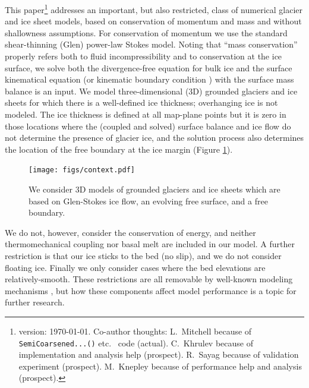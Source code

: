 \documentclass[letterpaper,final,12pt,reqno]{amsart}
\begin{document}
This paper\footnote{version: \today.  Co-author thoughts: L.~Mitchell because of \texttt{SemiCoarsened...()} etc.~ code (actual).  C.~Khrulev because of implementation and analysis help (prospect).  R.~Sayag because of validation experiment (prospect).  M.~Knepley because of performance help and analysis (prospect).} addresses an important, but also restricted, class of numerical glacier and ice sheet models, based on conservation of momentum and mass and without shallowness assumptions.  For conservation of momentum we use the standard shear-thinning (Glen) power-law Stokes model.  Noting that ``mass conservation'' properly refers both to fluid incompressibility and to conservation at the ice surface, we solve both the divergence-free equation for bulk ice and the surface kinematical equation (or kinematic boundary condition \cite{GreveBlatter2009}) with the surface mass balance is an input.  We model three-dimensional (3D) grounded glaciers and ice sheets for which there is a well-defined ice thickness; overhanging ice is not modeled.  The ice thickness is defined at all map-plane points but it is zero in those locations where the (coupled and solved) surface balance and ice flow do not determine the presence of glacier ice, and the solution process also determines the location of the free boundary at the ice margin \cite{SchoofHewitt2013} (Figure \ref{fig:cartoon}).

\begin{figure}[h]
\begin{center}
\texttt{[image: figs/context.pdf]}
\end{center}
\caption{We consider 3D models of grounded glaciers and ice sheets which are based on Glen-Stokes ice flow, an evolving free surface, and a free boundary.}
\label{fig:cartoon}
\end{figure}

We do not, however, consider the conservation of energy, and neither thermomechanical coupling nor basal melt are included in our model.  A further restriction is that our ice sticks to the bed (no slip), and we do not consider floating ice.  Finally we only consider cases where the bed elevations are relatively-smooth.  These restrictions are all removable by well-known modeling mechanisms \cite[for example]{Aschwandenetal2012,Winkelmannetal2011}, but how these components affect model performance is a topic for further research.
\end{document}

